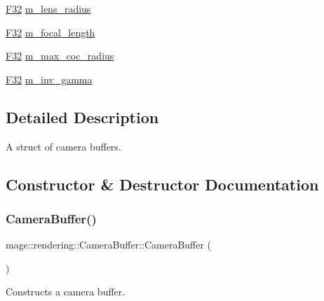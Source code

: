\begin{DoxyCompactItemize}
\hyperlink{namespacemage_aa97e833b45f06d60a0a9c4fc22ae02c0}{F32} \hyperlink{structmage_1_1rendering_1_1_camera_buffer_a7915bec843e03ad2248c08b10317ccc7}{m\+\_\+lens\+\_\+radius}
\item 
\hyperlink{namespacemage_aa97e833b45f06d60a0a9c4fc22ae02c0}{F32} \hyperlink{structmage_1_1rendering_1_1_camera_buffer_a7ed5079582d476597f8bc4d6a0b3f372}{m\+\_\+focal\+\_\+length}
\item 
\hyperlink{namespacemage_aa97e833b45f06d60a0a9c4fc22ae02c0}{F32} \hyperlink{structmage_1_1rendering_1_1_camera_buffer_a3273510e0a7bbdd9481fe67f9e223f59}{m\+\_\+max\+\_\+coc\+\_\+radius}
\item 
\hyperlink{namespacemage_aa97e833b45f06d60a0a9c4fc22ae02c0}{F32} \hyperlink{structmage_1_1rendering_1_1_camera_buffer_a0ff45fc9f243d43fa43952b026900ade}{m\+\_\+inv\+\_\+gamma}
\end{DoxyCompactItemize}


\subsection{Detailed Description}
A struct of camera buffers. 

\subsection{Constructor \& Destructor Documentation}
\hypertarget{structmage_1_1rendering_1_1_camera_buffer_a751c2923a5deb710d7c3957f04c89fcf}{}\label{structmage_1_1rendering_1_1_camera_buffer_a751c2923a5deb710d7c3957f04c89fcf} 
\subsubsection{\texorpdfstring{Camera\+Buffer()}{CameraBuffer()}\hspace{0.1cm}{\footnotesize\ttfamily [1/3]}}
{\footnotesize\ttfamily mage\+::rendering\+::\+Camera\+Buffer\+::\+Camera\+Buffer (\begin{DoxyParamCaption}{ }\end{DoxyParamCaption})\hspace{0.3cm}{\ttfamily [noexcept]}}

Constructs a camera buffer. \hypertarget{structmage_1_1rendering_1_1_camera_buffer_a08ff60a4695d723218c5cffb4b95cc59}{}\label{structmage_1_1rendering_1_1_camera_buffer_a08ff60a4695d723218c5cffb4b95cc59} 
